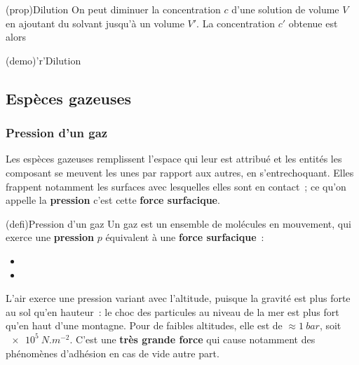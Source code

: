 \documentclass[../../main/main.tex]{subfiles}
\begin{document}
\begin{tcbraster}[raster columns=2, raster equal height=rows]
	\begin{tcb*}[label=prop:dilu](prop){Dilution}
		On peut diminuer la concentration $c$ d'une solution de volume $V$ en
		ajoutant du solvant jusqu'à un volume $V'$. La concentration $c'$
		obtenue est alors
		\psw{%
			\[
				\boxed{cV = c'V'}
				\Lra
				\boxed{\frac{c}{c'} = \frac{V'}{V}}
			\]
		}%
	\end{tcb*}
	\begin{tcb}[label=demo:dilu](demo)'r'{Dilution}
	\end{tcb}
\end{tcbraster}

\subsection{Espèces gazeuses}
\subsubsection{Pression d'un gaz}
Les espèces gazeuses remplissent l'espace qui leur est attribué et les entités
les composant se meuvent les unes par rapport aux autres, en s'entrechoquant.
Elles frappent notamment les surfaces avec lesquelles elles sont en contact~;
ce qu'on appelle la \textbf{pression} c'est cette \textbf{force surfacique}.
\smallbreak

\begin{tcb*}[label=def:pression, sidebyside,
		sidebyside align=top](defi){Pression d'un gaz}
	Un gaz est un ensemble de molécules en mouvement, qui exerce une
	\textbf{pression} $p$ équivalent à une \textbf{force surfacique}~:
	\psw{%
		\[\boxed{p = \frac{F}{S}}\]
	}%
	\vspace{-15pt}
	\tcblower
	\begin{itemize}
		\item {}%
		\item {}%
	\end{itemize}
	\vspace{-15pt}
\end{tcb*}

L'air exerce une pression variant avec l'altitude, puisque la gravité
est plus forte au sol qu'en hauteur~: le choc des particules au niveau
de la mer est plus fort qu'en haut d'une montagne.
\smallbreak
Pour de faibles altitudes, elle est de $\approx \SI{1}{bar}$, soit
$\SI{e5}{N.m^{-2}}$. C'est une \textbf{très grande force} qui cause notamment
des phénomènes d'adhésion en cas de vide autre part.
\end{document}
